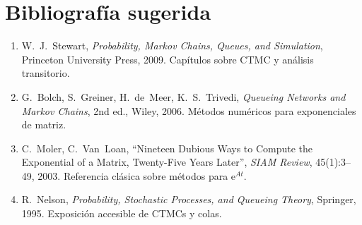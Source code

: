 \documentclass[11pt,a4paper]{article}
\theoremstyle{definition}
\theoremstyle{remark}
\newcommand{\e}{\mathrm{e}}
\begin{document}
\section*{Bibliografía sugerida}

\begin{enumerate}[nosep]
  \item W.~J.~Stewart, \textit{Probability, Markov Chains, Queues, and
        Simulation}, Princeton University Press, 2009.
        Capítulos sobre CTMC y análisis transitorio.
  \item G.~Bolch, S.~Greiner, H.~de~Meer, K.~S.~Trivedi,
        \textit{Queueing Networks and Markov Chains}, 2nd ed., Wiley, 2006.
        Métodos numéricos para exponenciales de matriz.
  \item C.~Moler, C.~Van~Loan, ``Nineteen Dubious Ways to Compute the
        Exponential of a Matrix, Twenty-Five Years Later'',
        \textit{SIAM Review}, 45(1):3--49, 2003.
        Referencia clásica sobre métodos para $\e^{At}$.
  \item R.~Nelson, \textit{Probability, Stochastic Processes, and Queueing
        Theory}, Springer, 1995.
        Exposición accesible de CTMCs y colas.
\end{enumerate}
\end{document}
